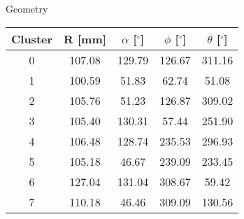 \caption{Geometry}
\label{tab:Geo}
\begin{tabular}{ccccc}
\hline
Cluster  &  R [mm]  &  $\alpha$ [$^\circ$]  &  $\phi$ [$^\circ$]  &  $\theta$ [$^\circ$]  \\
\hline
0        &  107.08  &  129.79               &  126.67             &  311.16  			  \\
1        &  100.59  &  51.83                &  62.74              &  51.08   			  \\
2        &  105.76  &  51.23                &  126.87             &  309.02  			  \\
3        &  105.40  &  130.31               &  57.44              &  251.90  			  \\
4        &  106.48  &  128.74               &  235.53             &  296.93  			  \\
5        &  105.18  &  46.67                &  239.09             &  233.45  			  \\
6        &  127.04  &  131.04               &  308.67             &  59.42   			  \\
7        &  110.18  &  46.46                &  309.09             &  130.56  			  \\
\hline
\end{tabular}
